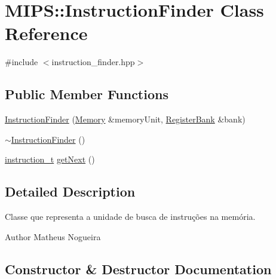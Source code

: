 \hypertarget{classMIPS_1_1InstructionFinder}{}\section{M\+I\+PS\+:\+:Instruction\+Finder Class Reference}
\label{classMIPS_1_1InstructionFinder}


{\ttfamily \#include $<$instruction\+\_\+finder.\+hpp$>$}

\subsection*{Public Member Functions}
\begin{DoxyCompactItemize}
\item 
\hyperlink{classMIPS_1_1InstructionFinder_abda3d40a1a5f355991fc5f135a826b96}{Instruction\+Finder} (\hyperlink{classMIPS_1_1Memory}{Memory} \&memory\+Unit, \hyperlink{classMIPS_1_1RegisterBank}{Register\+Bank} \&bank)
\item 
\hyperlink{classMIPS_1_1InstructionFinder_a9079f27b5bca86251ee97196abe20cec}{$\sim$\+Instruction\+Finder} ()
\item 
\hyperlink{core_8hpp_aa514fd240a0e29abb2a2e4c805d7f1a4}{instruction\+\_\+t} \hyperlink{classMIPS_1_1InstructionFinder_a73a242cbe648c2d5e1cd0dd9342f798a}{get\+Next} ()
\end{DoxyCompactItemize}


\subsection{Detailed Description}
Classe que representa a unidade de busca de instruções na memória.

\begin{DoxyAuthor}{Author}
Matheus Nogueira 
\end{DoxyAuthor}


\subsection{Constructor \& Destructor Documentation}

